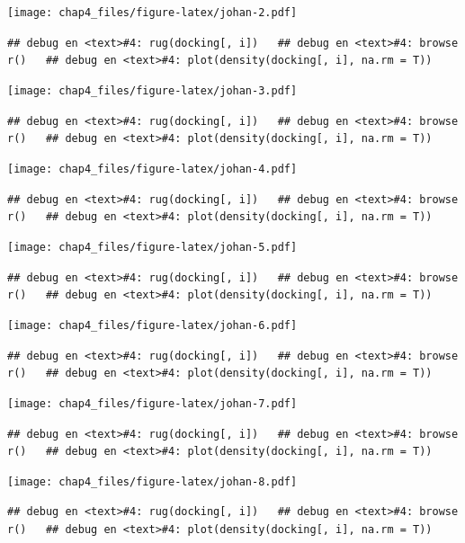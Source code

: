 \documentclass[]{article}
\begin{document}
{\texttt{[image: chap4\_files/figure-latex/johan-2.pdf]}

\texttt{\#\#\ debug\ en\ \textless{}text\textgreater{}\#4:\ rug(docking{[},\ i{]})\ \ \ \#\#\ debug\ en\ \textless{}text\textgreater{}\#4:\ browser()\ \ \ \#\#\ debug\ en\ \textless{}text\textgreater{}\#4:\ plot(density(docking{[},\ i{]},\ na.rm\ =\ T))}

\texttt{[image: chap4\_files/figure-latex/johan-3.pdf]}

\texttt{\#\#\ debug\ en\ \textless{}text\textgreater{}\#4:\ rug(docking{[},\ i{]})\ \ \ \#\#\ debug\ en\ \textless{}text\textgreater{}\#4:\ browser()\ \ \ \#\#\ debug\ en\ \textless{}text\textgreater{}\#4:\ plot(density(docking{[},\ i{]},\ na.rm\ =\ T))}

\texttt{[image: chap4\_files/figure-latex/johan-4.pdf]}

\texttt{\#\#\ debug\ en\ \textless{}text\textgreater{}\#4:\ rug(docking{[},\ i{]})\ \ \ \#\#\ debug\ en\ \textless{}text\textgreater{}\#4:\ browser()\ \ \ \#\#\ debug\ en\ \textless{}text\textgreater{}\#4:\ plot(density(docking{[},\ i{]},\ na.rm\ =\ T))}

\texttt{[image: chap4\_files/figure-latex/johan-5.pdf]}

\texttt{\#\#\ debug\ en\ \textless{}text\textgreater{}\#4:\ rug(docking{[},\ i{]})\ \ \ \#\#\ debug\ en\ \textless{}text\textgreater{}\#4:\ browser()\ \ \ \#\#\ debug\ en\ \textless{}text\textgreater{}\#4:\ plot(density(docking{[},\ i{]},\ na.rm\ =\ T))}

\texttt{[image: chap4\_files/figure-latex/johan-6.pdf]}

\texttt{\#\#\ debug\ en\ \textless{}text\textgreater{}\#4:\ rug(docking{[},\ i{]})\ \ \ \#\#\ debug\ en\ \textless{}text\textgreater{}\#4:\ browser()\ \ \ \#\#\ debug\ en\ \textless{}text\textgreater{}\#4:\ plot(density(docking{[},\ i{]},\ na.rm\ =\ T))}

\texttt{[image: chap4\_files/figure-latex/johan-7.pdf]}

\texttt{\#\#\ debug\ en\ \textless{}text\textgreater{}\#4:\ rug(docking{[},\ i{]})\ \ \ \#\#\ debug\ en\ \textless{}text\textgreater{}\#4:\ browser()\ \ \ \#\#\ debug\ en\ \textless{}text\textgreater{}\#4:\ plot(density(docking{[},\ i{]},\ na.rm\ =\ T))}

\texttt{[image: chap4\_files/figure-latex/johan-8.pdf]}

\texttt{\#\#\ debug\ en\ \textless{}text\textgreater{}\#4:\ rug(docking{[},\ i{]})\ \ \ \#\#\ debug\ en\ \textless{}text\textgreater{}\#4:\ browser()\ \ \ \#\#\ debug\ en\ \textless{}text\textgreater{}\#4:\ plot(density(docking{[},\ i{]},\ na.rm\ =\ T))}

}
\end{document}
